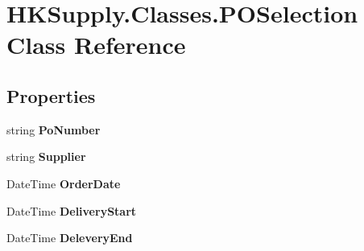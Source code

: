 \hypertarget{class_h_k_supply_1_1_classes_1_1_p_o_selection}{}\section{H\+K\+Supply.\+Classes.\+P\+O\+Selection Class Reference}
\label{class_h_k_supply_1_1_classes_1_1_p_o_selection}
\subsection*{Properties}
\begin{DoxyCompactItemize}
\item 
\mbox{\label{class_h_k_supply_1_1_classes_1_1_p_o_selection_a91b956faadba4a77dc29c4eede59d42f}} 
string {\bfseries Po\+Number}
\item 
\mbox{\label{class_h_k_supply_1_1_classes_1_1_p_o_selection_a76b3667a3c5dcf24c2dab586a3f6f520}} 
string {\bfseries Supplier}
\item 
\mbox{\label{class_h_k_supply_1_1_classes_1_1_p_o_selection_ad5d69b779d3c531efe0894eea52bf492}} 
Date\+Time {\bfseries Order\+Date}
\item 
\mbox{\label{class_h_k_supply_1_1_classes_1_1_p_o_selection_ab10758daa7728b67530070f6d5ff3aeb}} 
Date\+Time {\bfseries Delivery\+Start}
\item 
\mbox{\label{class_h_k_supply_1_1_classes_1_1_p_o_selection_a8738f62b35b6480e86d1bc5f4c4462aa}} 
Date\+Time {\bfseries Delevery\+End}
\item 
\mbox{\label{class_h_k_supply_1_1_classes_1_1_p_o_selection_a9a3f9464e7cb76f348aaa617e0bffed3}} 

\end{DoxyCompactItemize}

